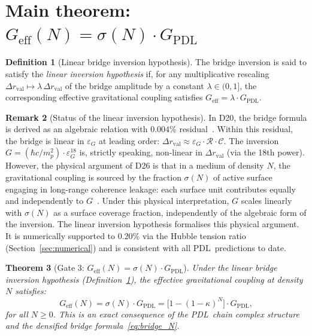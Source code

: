 \documentclass[11pt,a4paper]{article}
\newtheorem{theorem}{Theorem}[section]
\theoremstyle{definition}
\newtheorem{definition}[theorem]{Definition}
\newtheorem{remark}[theorem]{Remark}
\newcommand{\PDL}{\textnormal{PDL}}
\newcommand{\epsg}{\varepsilon_G}
\newcommand{\kap}{\kappa}
\newcommand{\calC}{\mathcal{C}}
\newcommand{\calR}{\mathcal{R}}
\newcommand{\GPDL}{G_{\mathrm{PDL}}}
\newcommand{\Geff}{G_{\mathrm{eff}}}
\newcommand{\sig}{\sigma}
\newcommand{\drval}{\Delta r_{\mathrm{val}}}
\begin{document}
\section{Main theorem: \texorpdfstring{$\Geff(N) = \sig(N)\cdot\GPDL$}{G\_eff(N) = sigma(N) G\_PDL}}
\label{sec:theorem}

\begin{definition}[Linear bridge inversion hypothesis]
\label{def:linear_inv}
The bridge inversion is said to satisfy the \emph{linear inversion hypothesis} if, for any multiplicative rescaling $\drval \mapsto \lambda\,\drval$ of the bridge amplitude by a constant $\lambda \in (0,1]$, the corresponding effective gravitational coupling satisfies $\Geff = \lambda\cdot\GPDL$.
\end{definition}

\begin{remark}[Status of the linear inversion hypothesis]
In D20, the bridge formula is derived as an algebraic relation with $0.004\%$ residual~\cite{Bridge_PDL_2026}. Within this residual, the bridge is linear in $\epsg$ at leading order: $\drval \approx \epsg\cdot\calR\cdot\calC$. The inversion $G = (\hbar c/m_p^2)\cdot\epsg^{18}$ is, strictly speaking, non-linear in $\drval$ (via the 18th power). However, the physical argument of D26 is that in a medium of density $N$, the gravitational coupling is sourced by the fraction $\sig(N)$ of active surface engaging in long-range coherence leakage: each surface unit contributes equally and independently to $G$~\cite{Hubble_PDL_2026}. Under this physical interpretation, $G$ scales linearly with $\sig(N)$ as a surface coverage fraction, independently of the algebraic form of the inversion. The linear inversion hypothesis formalises this physical argument. It is numerically supported to $0.20\%$ via the Hubble tension ratio (Section~\ref{sec:numerical}) and is consistent with all \PDL\ predictions to date.
\end{remark}

\begin{theorem}[Gate 3: $\Geff(N) = \sig(N)\cdot\GPDL$]
\label{thm:gate3}
Under the linear bridge inversion hypothesis (Definition~\ref{def:linear_inv}), the effective gravitational coupling at density $N$ satisfies:
\begin{equation}
\Geff(N) = \sig(N)\cdot\GPDL = \bigl[1-(1-\kap)^N\bigr]\cdot\GPDL,
\label{eq:Geff_theorem}
\end{equation}
for all $N \geq 0$. This is an exact consequence of the \PDL\ chain complex structure and the densified bridge formula~\eqref{eq:bridge_N}.
\end{theorem}
\end{document}
